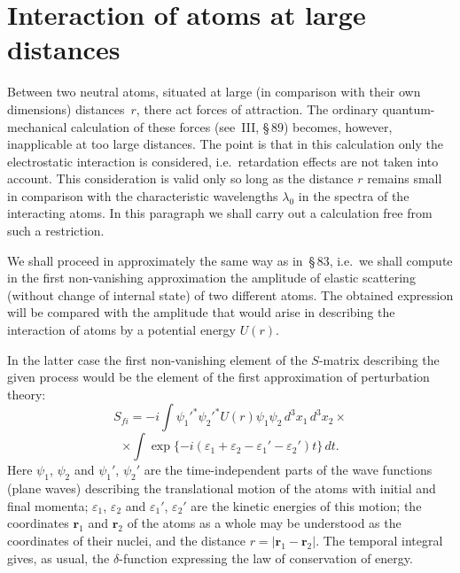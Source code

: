 \section{Interaction of atoms at large distances}

Between two neutral atoms, situated at large (in comparison with their own dimensions) distances~$r$, there act forces of attraction. The ordinary quantum-mechanical calculation of these forces (see~III, \S\,89) becomes, however, inapplicable at too large distances. The point is that in this calculation only the electrostatic interaction is considered, i.e.\ retardation effects are not taken into account. This consideration is valid only so long as the distance $r$ remains small in comparison with the characteristic wavelengths $\lambda_0$ in the spectra of the interacting atoms. In this paragraph we shall carry out a calculation free from such a restriction.

We shall proceed in approximately the same way as in~\S\,83, i.e.\ we shall compute in the first non-vanishing approximation the amplitude of elastic scattering (without change of internal state) of two different atoms. The obtained expression will be compared with the amplitude that would arise in describing the interaction of atoms by a potential energy $U(r)$.

In the latter case the first non-vanishing element of the $S$-matrix describing the given process would be the element of the first approximation of perturbation theory:
\begin{equation}
S_{fi} = -i\int\psi_1'^*\psi_2'^*U(r)\psi_1\psi_2\,d^3x_1\,d^3x_2\times
\end{equation}
\[
\times\int\exp\{-i(\varepsilon_1 + \varepsilon_2 - \varepsilon_1' - \varepsilon_2')t\}\,dt.
\tag{85.1}
\]
Here $\psi_1$, $\psi_2$ and $\psi_1'$, $\psi_2'$ are the time-independent parts of the wave functions (plane waves) describing the translational motion of the atoms with initial and final momenta; $\varepsilon_1$, $\varepsilon_2$ and $\varepsilon_1'$, $\varepsilon_2'$ are the kinetic energies of this motion; the coordinates $\mathbf{r}_1$ and $\mathbf{r}_2$ of the atoms as a whole may be understood as the coordinates of their nuclei, and the distance $r = |\mathbf{r}_1 - \mathbf{r}_2|$. The temporal integral gives, as usual, the $\delta$-function expressing the law of conservation of energy.

